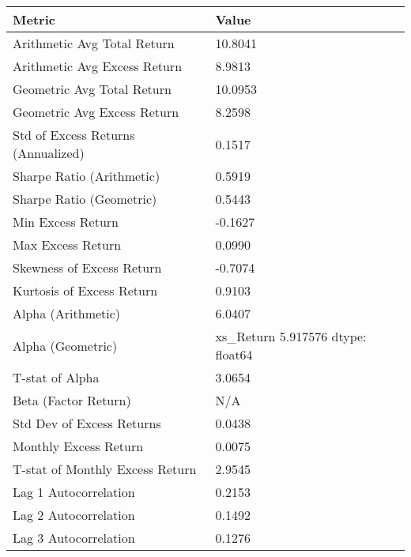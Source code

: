 \begin{tabular}{ll}
\toprule
Metric & Value \\
\midrule
Arithmetic Avg Total Return & 10.8041 \\
Arithmetic Avg Excess Return & 8.9813 \\
Geometric Avg Total Return & 10.0953 \\
Geometric Avg Excess Return & 8.2598 \\
Std of Excess Returns (Annualized) & 0.1517 \\
Sharpe Ratio (Arithmetic) & 0.5919 \\
Sharpe Ratio (Geometric) & 0.5443 \\
Min Excess Return & -0.1627 \\
Max Excess Return & 0.0990 \\
Skewness of Excess Return & -0.7074 \\
Kurtosis of Excess Return & 0.9103 \\
Alpha (Arithmetic) & 6.0407 \\
Alpha (Geometric) & xs_Return    5.917576
dtype: float64 \\
T-stat of Alpha & 3.0654 \\
Beta (Factor Return) & N/A \\
Std Dev of Excess Returns & 0.0438 \\
Monthly Excess Return & 0.0075 \\
T-stat of Monthly Excess Return & 2.9545 \\
Lag 1 Autocorrelation & 0.2153 \\
Lag 2 Autocorrelation & 0.1492 \\
Lag 3 Autocorrelation & 0.1276 \\
\bottomrule
\end{tabular}

